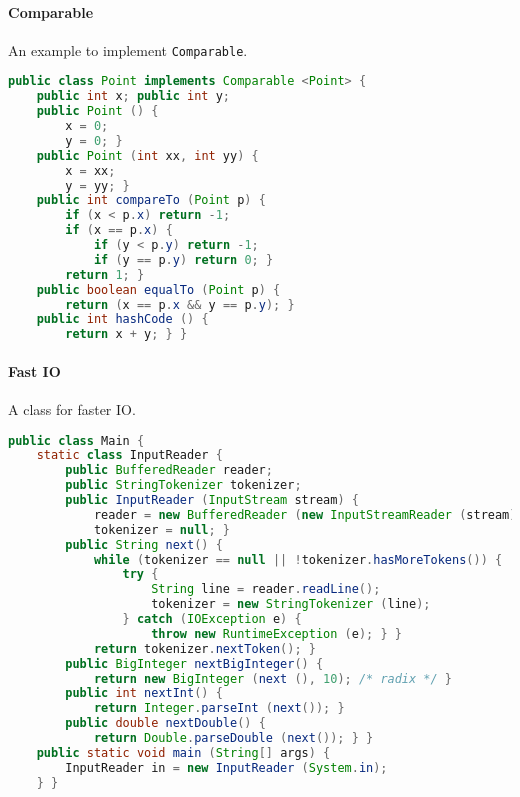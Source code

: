 \paragraph{Comparable}
An example to implement \texttt{Comparable}.
\begin{lstlisting}[language=java]
public class Point implements Comparable <Point> {
	public int x; public int y;
	public Point () {
		x = 0;
		y = 0; }
	public Point (int xx, int yy) {
		x = xx;
		y = yy; }
	public int compareTo (Point p) {
		if (x < p.x) return -1;
		if (x == p.x) {
			if (y < p.y) return -1;
			if (y == p.y) return 0; }
		return 1; }
	public boolean equalTo (Point p) {
		return (x == p.x && y == p.y); }
	public int hashCode () {
		return x + y; } }
\end{lstlisting}

\paragraph{Fast IO}
A class for faster IO.
\begin{lstlisting}[language=java]
public class Main {
	static class InputReader {
		public BufferedReader reader;
		public StringTokenizer tokenizer;
		public InputReader (InputStream stream) {
			reader = new BufferedReader (new InputStreamReader (stream), 32768);
			tokenizer = null; }
		public String next() {
			while (tokenizer == null || !tokenizer.hasMoreTokens()) {
				try {
					String line = reader.readLine();
					tokenizer = new StringTokenizer (line);
				} catch (IOException e) {
					throw new RuntimeException (e); } }
			return tokenizer.nextToken(); }
		public BigInteger nextBigInteger() {
			return new BigInteger (next (), 10); /* radix */ }
		public int nextInt() {
			return Integer.parseInt (next()); }
		public double nextDouble() {
			return Double.parseDouble (next()); } }
	public static void main (String[] args) {
		InputReader in = new InputReader (System.in);
	} }
\end{lstlisting}
